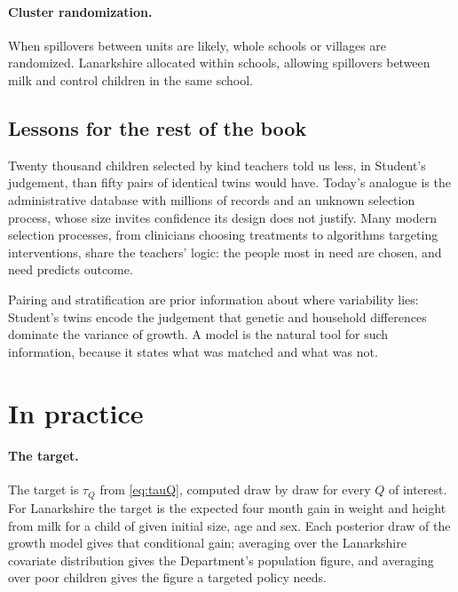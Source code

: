 \paragraph{Cluster randomization.} When spillovers between units are likely, whole schools or villages are randomized. Lanarkshire allocated within schools, allowing spillovers between milk and control children in the same school.




\subsection{Lessons for the rest of the book}

Twenty thousand children selected by kind teachers told us less, in Student's judgement, than fifty pairs of identical twins would have. Today's analogue is the administrative database with millions of records and an unknown selection process, whose size invites confidence its design does not justify. Many modern selection processes, from clinicians choosing treatments to algorithms targeting interventions, share the teachers' logic: the people most in need are chosen, and need predicts outcome.

Pairing and stratification are prior information about where variability lies: Student's twins encode the judgement that genetic and household differences dominate the variance of growth. A model is the natural tool for such information, because it states what was matched and what was not.

\section{In practice}

\paragraph{The target.} The target is $\tau_Q$ from \eqref{eq:tauQ}, computed draw by draw for every $Q$ of interest. For Lanarkshire the target is the expected four month gain in weight and height from milk for a child of given initial size, age and sex. Each posterior draw of the growth model gives that conditional gain; averaging over the Lanarkshire covariate distribution gives the Department's population figure, and averaging over poor children gives the figure a targeted policy needs.

